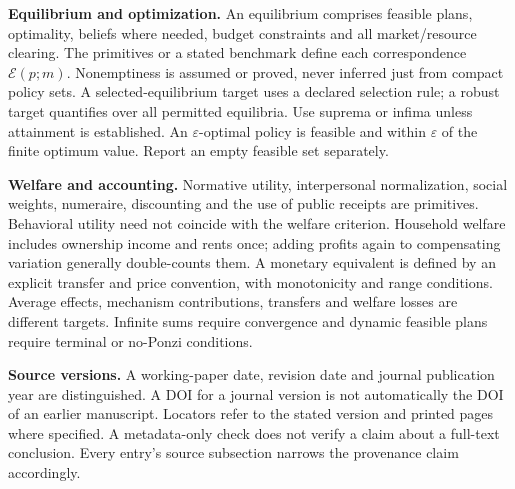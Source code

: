\documentclass[11pt,a4paper]{article}
\begin{document}
\textbf{Equilibrium and optimization.} An equilibrium comprises feasible plans, optimality, beliefs where needed, budget constraints and all market/resource clearing. The primitives or a stated benchmark define each correspondence \(\mathcal E(p;m)\). Nonemptiness is assumed or proved, never inferred just from compact policy sets. A selected-equilibrium target uses a declared selection rule; a robust target quantifies over all permitted equilibria. Use suprema or infima unless attainment is established. An \(\varepsilon\)-optimal policy is feasible and within \(\varepsilon\) of the finite optimum value. Report an empty feasible set separately.

\textbf{Welfare and accounting.} Normative utility, interpersonal normalization, social weights, numeraire, discounting and the use of public receipts are primitives. Behavioral utility need not coincide with the welfare criterion. Household welfare includes ownership income and rents once; adding profits again to compensating variation generally double-counts them. A monetary equivalent is defined by an explicit transfer and price convention, with monotonicity and range conditions. Average effects, mechanism contributions, transfers and welfare losses are different targets. Infinite sums require convergence and dynamic feasible plans require terminal or no-Ponzi conditions.

\textbf{Source versions.} A working-paper date, revision date and journal publication year are distinguished. A DOI for a journal version is not automatically the DOI of an earlier manuscript. Locators refer to the stated version and printed pages where specified. A metadata-only check does not verify a claim about a full-text conclusion. Every entry's source subsection narrows the provenance claim accordingly.
\end{document}
